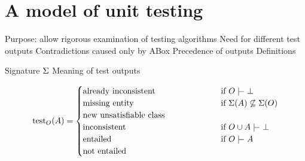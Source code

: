 \documentclass[paper.tex]{subfiles}
\begin{document}
\section{A model of unit testing}
\label{sec:model}

\begin{todos}
  \todo Purpose: allow rigorous examination of testing algorithms
  \todo Need for different test outputs
  \todo Contradictions caused only by ABox
  \todo Precedence of outputs
  \todo Definitions
  \begin{todos}
    \todo Signature $\Sigma$
    \todo Meaning of test outputs
  \end{todos}
\end{todos}

\begin{description}
  \item[]
\end{description}

\[
  \test_O(A) =
  \begin{cases}
    \casesbox{already inconsistent} &
      \text{if } O \sementails \bot \\
    \casesbox{missing entity} &
      \text{if } \signature(A) \not\subseteq \signature(O) \\
    \casesbox{new unsatisfiable class} & \\
    \casesbox{inconsistent} &
      \text{if } O \union A \sementails \bot \\
    \casesbox{entailed} &
      \text{if } O \sementails A \\
    \casesbox{not entailed} & \\
  \end{cases}
\]
\end{document}

